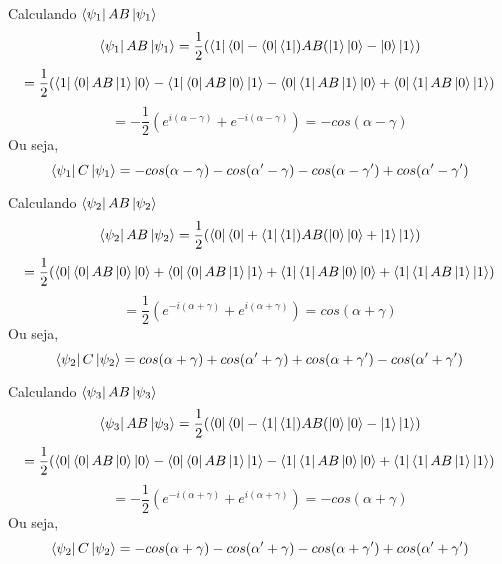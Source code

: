 \documentclass[
12pt,				%
openright,			%
oneside,			%
a4paper,			%
english,			%
french,				%
spanish,			%
brazil				%
]{abntex2}
\begin{document}
Calculando $\bra{\psi_1}AB\ket{\psi_1}$
\begin{equation}
	\bra{\psi_1}AB\ket{\psi_1}= \frac{1}{2}(\bra{1}\bra{0}- \bra{0}\bra{1}) AB(\ket{1}\ket{0}- \ket{0}\ket{1})
\end{equation}
\begin{equation}
=\frac{1}{2}(\bra{1}\bra{0}AB\ket{1}\ket{0} - \bra{1}\bra{0}AB\ket{0}\ket{1} -\bra{0}\bra{1}AB\ket{1}\ket{0} + \bra{0}\bra{1}AB\ket{0}\ket{1})
\end{equation}
\begin{equation}
	=-\frac{1}{2}(e^{i(\alpha-\gamma)} +e^{-i(\alpha-\gamma)} )=-cos(\alpha-\gamma)
\end{equation}
Ou seja,
\begin{equation}
	\bra{\psi_1}C\ket{\psi_1}= -cos(\alpha-\gamma) -cos(\alpha'-\gamma) -cos(\alpha-\gamma') + cos(\alpha'-\gamma')
\end{equation}

Calculando $\bra{\psi_2}AB\ket{\psi_2}$
\begin{equation}
	\bra{\psi_2}AB\ket{\psi_2}= \frac{1}{2}(\bra{0}\bra{0}+ \bra{1}\bra{1}) AB(\ket{0}\ket{0}+ \ket{1}\ket{1})
\end{equation}
\begin{equation}
	=\frac{1}{2}(\bra{0}\bra{0}AB\ket{0}\ket{0} + \bra{0}\bra{0}AB\ket{1}\ket{1} +\bra{1}\bra{1}AB\ket{0}\ket{0} + \bra{1}\bra{1}AB\ket{1}\ket{1})
\end{equation}
\begin{equation}
	=\frac{1}{2}(e^{-i(\alpha+\gamma)} +e^{i(\alpha+\gamma)} )=cos(\alpha+\gamma)
\end{equation}
Ou seja,
\begin{equation}
	\bra{\psi_2}C\ket{\psi_2}= cos(\alpha+\gamma) +cos(\alpha'+\gamma) +cos(\alpha+\gamma') - cos(\alpha'+\gamma')
\end{equation}

Calculando $\bra{\psi_3}AB\ket{\psi_3}$
\begin{equation}
	\bra{\psi_3}AB\ket{\psi_3}= \frac{1}{2}(\bra{0}\bra{0}- \bra{1}\bra{1}) AB(\ket{0}\ket{0}- \ket{1}\ket{1})
\end{equation}
\begin{equation}
	=\frac{1}{2}(\bra{0}\bra{0}AB\ket{0}\ket{0} - \bra{0}\bra{0}AB\ket{1}\ket{1} -\bra{1}\bra{1}AB\ket{0}\ket{0} + \bra{1}\bra{1}AB\ket{1}\ket{1})
\end{equation}
\begin{equation}
	=-\frac{1}{2}(e^{-i(\alpha+\gamma)} +e^{i(\alpha+\gamma)} )=-cos(\alpha+\gamma)
\end{equation}
Ou seja,
\begin{equation}
	\bra{\psi_2}C\ket{\psi_2}= -cos(\alpha+\gamma) -cos(\alpha'+\gamma) -cos(\alpha+\gamma') + cos(\alpha'+\gamma')
\end{equation}
\end{document}
